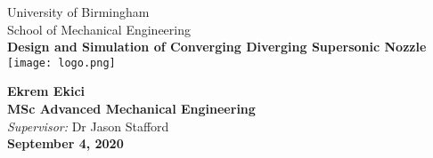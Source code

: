 \begin{titlepage}
	
	\begin{center}
		{\color{white}
			{\LARGE University of Birmingham}\\[0.25cm]
			{\Large School of Mechanical Engineering}\\[1.5cm]
			\linespread{1.2}\huge {\bfseries Design and Simulation of Converging Diverging Supersonic Nozzle}\\[1.5cm]
			
			\texttt{[image: logo.png]}
			
			
			\linespread{1}
			{\Large\bf Ekrem Ekici}\\[0.5cm]
			{\large\bf MSc Advanced Mechanical Engineering}\\[0.5cm]
			{\large \emph{Supervisor:} Dr Jason Stafford}\\[0.5cm]
			{\large\bf September 4, 2020}
		}
	\end{center}
	\pagecolor{black}\afterpage{\nopagecolor}
	\afterpage{\blankpage}
\end{titlepage}
